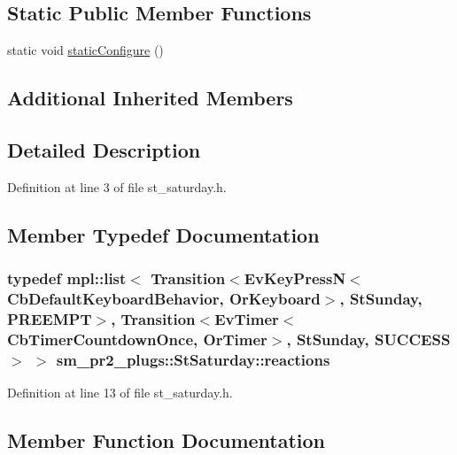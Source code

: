 \subsection*{Static Public Member Functions}
\begin{DoxyCompactItemize}
\item 
static void \hyperlink{structsm__pr2__plugs_1_1StSaturday_a84804f11df26c0fe3a3dd35ae09cad08}{static\+Configure} ()
\end{DoxyCompactItemize}
\subsection*{Additional Inherited Members}


\subsection{Detailed Description}


Definition at line 3 of file st\+\_\+saturday.\+h.



\subsection{Member Typedef Documentation}
\subsubsection[{\texorpdfstring{reactions}{reactions}}]{\setlength{\rightskip}{0pt plus 5cm}typedef mpl\+::list$<$ Transition$<$Ev\+Key\+PressN$<$Cb\+Default\+Keyboard\+Behavior, {\bf Or\+Keyboard}$>$, {\bf St\+Sunday}, {\bf P\+R\+E\+E\+M\+PT}$>$, Transition$<$Ev\+Timer$<$Cb\+Timer\+Countdown\+Once, {\bf Or\+Timer}$>$, {\bf St\+Sunday}, {\bf S\+U\+C\+C\+E\+SS}$>$ $>$ {\bf sm\+\_\+pr2\+\_\+plugs\+::\+St\+Saturday\+::reactions}}\hypertarget{structsm__pr2__plugs_1_1StSaturday_aedc30deb3614a9cc930b62838e5377d7}{}\label{structsm__pr2__plugs_1_1StSaturday_aedc30deb3614a9cc930b62838e5377d7}


Definition at line 13 of file st\+\_\+saturday.\+h.



\subsection{Member Function Documentation}
